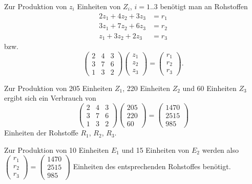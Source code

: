 Zur Produktion von $z_i$ Einheiten von $Z_i$, $i = 1..3$ benötigt man an Rohstoffen
\begin{align*}
  2z_1 + 4z_2 + 3z_3 &= r_1\\
  3z_1 + 7z_2 + 6z_3 &= r_2\\
  z_1 + 3z_2 + 2z_3 &= r_3
\end{align*}
bzw.
\[ \begin{pmatrix} 2 & 4 & 3 \\ 3 & 7 & 6 \\ 1 & 3 & 2 \end{pmatrix} \begin{pmatrix} z_1 \\ z_2 \\ z_3 \end{pmatrix} = \begin{pmatrix} r_1 \\ r_2 \\ r_3 \end{pmatrix} . \]

Zur Produktion von 205 Einheiten $Z_1$, 220 Einheiten $Z_2$ und 60 Einheiten $Z_3$ ergibt sich ein Verbrauch von
\[ \begin{pmatrix} 2 & 4 & 3 \\ 3 & 7 & 6 \\ 1 & 3 & 2 \end{pmatrix} \begin{pmatrix} 205 \\ 220 \\ 60 \end{pmatrix} = \begin{pmatrix} 1470 \\ 2515 \\ 985 \end{pmatrix} \]
Einheiten der Rohstoffe $R_1$, $R_2$, $R_3$.

Zur Produktion von 10 Einheiten $E_1$ und 15 Einheiten von $E_2$ werden also $\begin{pmatrix} r_1 \\ r_2 \\ r_3 \end{pmatrix} = \begin{pmatrix} 1470 \\ 2515 \\ 985 \end{pmatrix}$ Einheiten des entsprechenden Rohstoffes benötigt.


